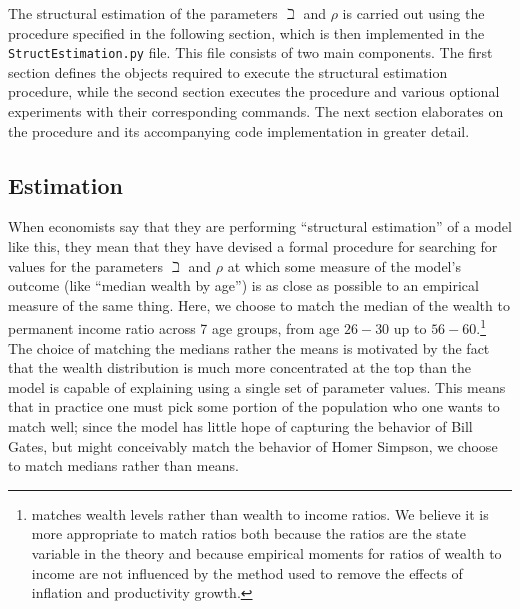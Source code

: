 \documentclass[titlepage, headings=optiontotocandhead]{econtex}
\begin{document}
The structural estimation of the parameters $\beth$ and $\rho$ is carried out using
the procedure specified in the following section, which is then implemented in
the \texttt{StructEstimation.py} file. This file consists of two main components. The
first section defines the objects required to execute the structural estimation procedure,
while the second section executes the procedure and various optional
experiments with their corresponding commands. The next section elaborates on the procedure
and its accompanying code implementation in greater detail.

\subsection{Estimation}

When economists say that they are performing ``structural estimation''
of a model like this, they mean that they have devised a
formal procedure for searching for values for the parameters $\beth$
and $\rho$ at which some measure of the model's outcome (like
``median wealth by age'') is as close as possible to an empirical measure
of the same thing. Here, we choose to match the median of the
wealth to permanent income ratio across 7 age groups, from age $26-30$
up to $56-60$.\footnote{\cite{cagettiWprofiles}
  matches wealth levels rather than wealth to income ratios. We
  believe it is more appropriate to match ratios both because the
  ratios are the state variable in the theory and because empirical
  moments for ratios of wealth to income are not influenced by the
  method used to remove the effects of inflation and productivity
  growth.} The choice of matching the medians rather the means is
motivated by the fact that the wealth distribution is much more
concentrated at the top than the model is capable of explaining using a single
set of parameter values.  This means that in practice one must pick
some portion of the population who one wants to match well; since the
model has little hope of capturing the behavior of Bill Gates, but
might conceivably match the behavior of Homer Simpson, we choose to
match medians rather than means.
\end{document}
